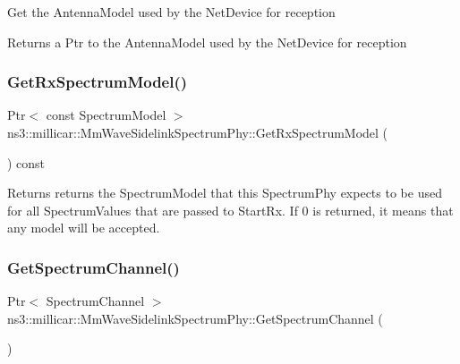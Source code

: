 Get the Antenna\+Model used by the Net\+Device for reception

\begin{DoxyReturn}{Returns}
a Ptr to the Antenna\+Model used by the Net\+Device for reception 
\end{DoxyReturn}
\mbox{\label{classns3_1_1millicar_1_1MmWaveSidelinkSpectrumPhy_adf0968d0659b5790d71a1b41df56c221}} 
\subsubsection{\texorpdfstring{Get\+Rx\+Spectrum\+Model()}{GetRxSpectrumModel()}}
{\footnotesize\ttfamily Ptr$<$ const Spectrum\+Model $>$ ns3\+::millicar\+::\+Mm\+Wave\+Sidelink\+Spectrum\+Phy\+::\+Get\+Rx\+Spectrum\+Model (\begin{DoxyParamCaption}{ }\end{DoxyParamCaption}) const}

\begin{DoxyReturn}{Returns}
returns the Spectrum\+Model that this Spectrum\+Phy expects to be used for all Spectrum\+Values that are passed to Start\+Rx. If 0 is returned, it means that any model will be accepted. 
\end{DoxyReturn}
\mbox{\label{classns3_1_1millicar_1_1MmWaveSidelinkSpectrumPhy_a831e25da1a41abd432e7e412abdb2e90}} 
\subsubsection{\texorpdfstring{Get\+Spectrum\+Channel()}{GetSpectrumChannel()}}
{\footnotesize\ttfamily Ptr$<$ Spectrum\+Channel $>$ ns3\+::millicar\+::\+Mm\+Wave\+Sidelink\+Spectrum\+Phy\+::\+Get\+Spectrum\+Channel (\begin{DoxyParamCaption}{ }\end{DoxyParamCaption})}



